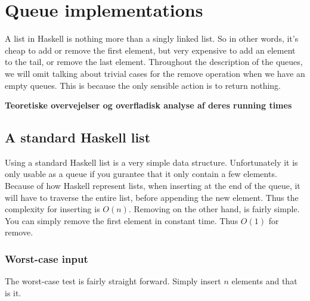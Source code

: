 \section*{Queue implementations}
A list in Haskell is nothing more than a singly linked list. So in other words, it's cheap to add or remove the first element, but very expensive to add an element to the tail, or remove the last element. Throughout the description of the queues, we will omit talking about trivial cases for the remove operation when we have an empty queues. This is because the only sensible action is to return nothing.

\textbf{Teoretiske overvejelser og overfladisk analyse af deres running times}

\subsection*{A standard Haskell list}
Using a standard Haskell list is a very simple data structure. Unfortunately it is only usable as a queue if you gurantee that it only contain a few elements. Because of how Haskell represent lists, when inserting at the end of the queue, it will have to traverse the entire list, before appending the new element. Thus the complexity for inserting is $O(n)$. Removing on the other hand, is fairly simple. You can simply remove the first element in constant time. Thus $O(1)$ for remove.

\subsubsection{Worst-case input}
The worst-case test is fairly straight forward. Simply insert $n$ elements and that is it.

